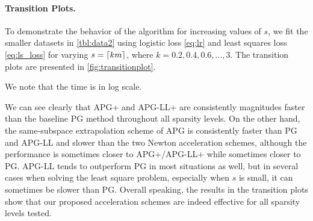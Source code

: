 \documentclass{article}
\newcommand{\Alert}[1]{{ #1}}
\newcommand{\Alertt}[1]{{#1}}
\theoremstyle{plain}
\theoremstyle{definition}
\theoremstyle{remark}
\DeclarePairedDelimiter{\ceil}{\lceil}{\rceil}
\begin{document}
\Alert{\paragraph{{Transition Plots.}} To demonstrate the behavior of the 
algorithm for increasing values of $s$, we fit the smaller datasets in \cref{tbl:data2} 
using logistic loss \cref{eq:lr} and least squares loss \cref{eq:ls_loss} for 
	varying 
	$s = \ceil{km}$, where $k=0.2,0.4,0.6,\dots,3$. \Alertt{The transition plots
	 are presented in
	 \cref{fig:transitionplot}.}} We note that the time is in log
	 scale.
	
	We can see clearly that APG+ and APG-LL+ are consistently magnitudes faster
	than the baseline PG method throughout all sparsity levels.
	On the other hand, the same-subspace extrapolation scheme of APG is
	consistently faster than PG and APG-LL and slower than the two Newton
	acceleration schemes, although the performance is sometimes closer to
	APG+/APG-LL+ while sometimes closer to PG.
	APG-LL tends to outperform PG in most situations as well, but in
	several cases when solving the least square problem, especially when
	$s$ is small, it can sometimes be slower than PG.
	Overall speaking, the results in the transition plots show that our
	proposed acceleration schemes are indeed effective for all sparsity
	levels tested.
\end{document}
